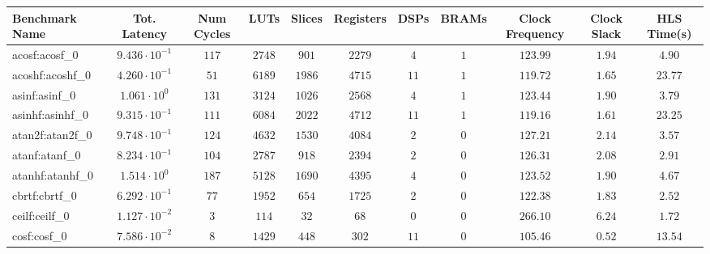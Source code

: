 \begin{tabular}{|l|c|c|c|c|c|c|c|c|c|c|}
\hline
Benchmark Name               & Tot. Latency            & Num Cycles & LUTs       & Slices    & Registers & DSPs    & BRAMs & Clock Frequency & Clock Slack & HLS Time(s) \\
\hline
acosf:acosf\_0               & $ 9.436 \cdot 10^{-1} $ & $ 117    $ & $ 2748   $ & $ 901   $ & $ 2279  $ & $ 4   $ & $ 1 $ & $ 123.99      $ & $ 1.94    $ & $ 4.90    $ \\
acoshf:acoshf\_0             & $ 4.260 \cdot 10^{-1} $ & $ 51     $ & $ 6189   $ & $ 1986  $ & $ 4715  $ & $ 11  $ & $ 1 $ & $ 119.72      $ & $ 1.65    $ & $ 23.77   $ \\
asinf:asinf\_0               & $ 1.061 \cdot 10^{0}  $ & $ 131    $ & $ 3124   $ & $ 1026  $ & $ 2568  $ & $ 4   $ & $ 1 $ & $ 123.44      $ & $ 1.90    $ & $ 3.79    $ \\
asinhf:asinhf\_0             & $ 9.315 \cdot 10^{-1} $ & $ 111    $ & $ 6084   $ & $ 2022  $ & $ 4712  $ & $ 11  $ & $ 1 $ & $ 119.16      $ & $ 1.61    $ & $ 23.25   $ \\
atan2f:atan2f\_0             & $ 9.748 \cdot 10^{-1} $ & $ 124    $ & $ 4632   $ & $ 1530  $ & $ 4084  $ & $ 2   $ & $ 0 $ & $ 127.21      $ & $ 2.14    $ & $ 3.57    $ \\
atanf:atanf\_0               & $ 8.234 \cdot 10^{-1} $ & $ 104    $ & $ 2787   $ & $ 918   $ & $ 2394  $ & $ 2   $ & $ 0 $ & $ 126.31      $ & $ 2.08    $ & $ 2.91    $ \\
atanhf:atanhf\_0             & $ 1.514 \cdot 10^{0}  $ & $ 187    $ & $ 5128   $ & $ 1690  $ & $ 4395  $ & $ 4   $ & $ 0 $ & $ 123.52      $ & $ 1.90    $ & $ 4.67    $ \\
cbrtf:cbrtf\_0               & $ 6.292 \cdot 10^{-1} $ & $ 77     $ & $ 1952   $ & $ 654   $ & $ 1725  $ & $ 2   $ & $ 0 $ & $ 122.38      $ & $ 1.83    $ & $ 2.52    $ \\
ceilf:ceilf\_0               & $ 1.127 \cdot 10^{-2} $ & $ 3      $ & $ 114    $ & $ 32    $ & $ 68    $ & $ 0   $ & $ 0 $ & $ 266.10      $ & $ 6.24    $ & $ 1.72    $ \\
cosf:cosf\_0                 & $ 7.586 \cdot 10^{-2} $ & $ 8      $ & $ 1429   $ & $ 448   $ & $ 302   $ & $ 11  $ & $ 0 $ & $ 105.46      $ & $ 0.52    $ & $ 13.54   $ \\

\end{tabular}
